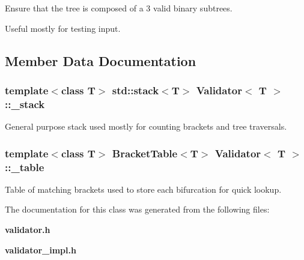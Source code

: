 Ensure that the tree is composed of a 3 valid binary subtrees. 

Useful mostly for testing input. 

\subsection{Member Data Documentation}
\subsubsection{\setlength{\rightskip}{0pt plus 5cm}template$<$class T$>$ std::stack$<$T$>$ {\bf Validator}$<$ T $>$::{\bf \_\-stack}\hspace{0.3cm}{\tt  [protected]}}\label{classValidator_p1}


General purpose stack used mostly for counting brackets and tree traversals. 

\subsubsection{\setlength{\rightskip}{0pt plus 5cm}template$<$class T$>$ {\bf Bracket\-Table}$<$T$>$ {\bf Validator}$<$ T $>$::{\bf \_\-table}\hspace{0.3cm}{\tt  [protected]}}\label{classValidator_p0}


Table of matching brackets used to store each bifurcation for quick lookup. 



The documentation for this class was generated from the following files:\begin{CompactItemize}
\item 
{\bf validator.h}\item 
{\bf validator\_\-impl.h}\end{CompactItemize}
